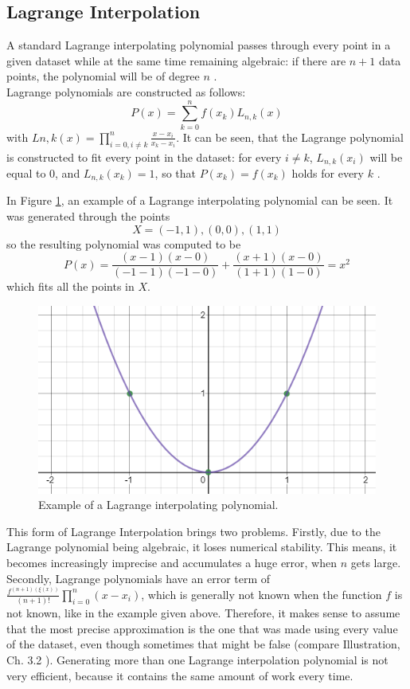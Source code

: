 \documentclass[a4paper,11pt, notitlepage]{article}
\begin{document}
\begin{onehalfspace}
\subsection{Lagrange Interpolation}
\label{subsec:Lagrange}
A standard Lagrange interpolating polynomial passes through every point in a given dataset while at the same time remaining algebraic: if there are $n+1$ data points, the polynomial will be of degree $n$ \cite{burden1985numerical}. \\
Lagrange polynomials are constructed as follows: 
$$P(x)=\sum_{k=0}^{n}f(x_k)L_{n, k}(x)$$
with $L{n, k}(x)=\prod_{i=0, i\neq k}^{n}\frac{x-x_i}{x_k - x_i}$. It can be seen, that the Lagrange polynomial is constructed to fit every point in the dataset: for every $i \neq k$, $L_{n, k}(x_i)$ will be equal to 0, and $L_{n, k}(x_k)=1$, so that $P(x_k)=f(x_k)$ holds for every $k$ \cite{burden1985numerical}.

In Figure \ref{fig:lag-example}, an example of a Lagrange interpolating polynomial can be seen. It was generated through the points 
$$X = {(-1, 1), (0, 0), (1, 1)}$$
so the resulting polynomial was computed to be
$$P(x) = \frac{(x-1)(x-0)}{(-1-1)(-1-0)} + \frac{(x+1)(x-0)}{(1+1)(1-0)}=x^2$$
which fits all the points in $X$.

\begin{figure}[H]
	\centering
	\includegraphics[width=\textwidth]{./images/lag-example.png}
	\caption{Example of a Lagrange interpolating polynomial.}
	\label{fig:lag-example}
\end{figure}

This form of Lagrange Interpolation brings two problems. Firstly, due to the Lagrange polynomial being algebraic, it loses numerical stability. This means, it becomes increasingly imprecise and accumulates a huge error, when $n$ gets large.
Secondly, Lagrange polynomials have an error term of $\frac{f^{(n+1)(\xi(x))}}{(n+1)!}\prod_{i=0}^{n}(x-x_i)$, which is generally not known when the function $f$ is not known, like in the example given above. Therefore, it makes sense to assume that the most precise approximation is the one that was made using every value of the dataset, even though sometimes that might be false (compare Illustration, Ch. 3.2 \cite{burden1985numerical}). Generating more than one Lagrange interpolation polynomial is not very efficient, because it contains the same amount of work every time.


\end{onehalfspace}
\end{document}
